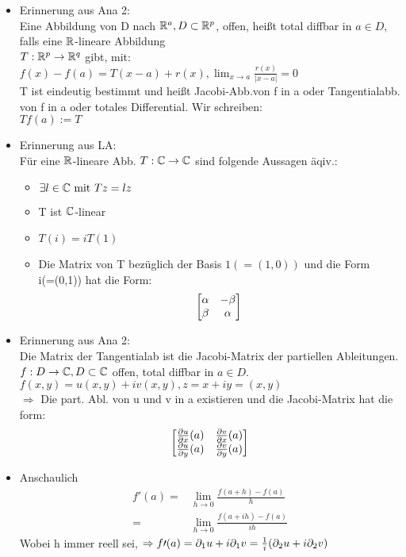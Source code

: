 \documentclass[11pt]{article}
\begin{document}
\begin{bemerkung}
\leavevmode
\begin{itemize}
	\item
	Erinnerung aus Ana 2:\\
	Eine Abbildung von D nach $\mathbb{R}^a, D \subset \mathbb{R}^p$, offen, heißt total
	diffbar in $a \in D$, falls eine $\mathbb{R}$-lineare Abbildung \\
	$T: \mathbb{R}^p \to \mathbb{R}^q$ gibt, mit:\\
	$f(x)-f(a) = T(x-a) +r(x), \lim_{x \to a} \frac{r(x)}{|x-a|}= 0$\\
	T ist eindeutig bestimmt und heißt Jacobi-Abb.von f in a 
	oder Tangentialabb. von f in a oder totales Differential. Wir 
	schreiben: \\
	$Tf(a) := T$ \\
	\item
	Erinnerung aus LA:\\
	Für eine $\mathbb{R}$-lineare Abb. $T: \mathbb{C} \to \mathbb{C}$ sind folgende Aussagen äqiv.:
	\begin{itemize}
		\item
		$\exists l \in \mathbb{C} \text{ mit } Tz = lz$
		\item
		T ist $\mathbb{C}$-linear
		\item
		$T(i) = iT(1)$
		\item
		Die Matrix von T bezüglich der Basis $1(=(1,0))$ und die Form \\
		i(=(0,1)) hat die Form:
		\[
		\begin{bmatrix}
		\alpha & -\beta\\
		\beta & \alpha
		\end{bmatrix}
		\]
	\end{itemize}
	\item
	Erinnerung aus Ana 2:\\
	Die Matrix der Tangentialab ist die Jacobi-Matrix der 
	partiellen Ableitungen.\\
	$f:D \to \mathbb{C}, D\subset \mathbb{C}$ offen, total diffbar in $a \in D$.\\
	$f(x,y) = u(x,y) +iv(x,y), z = x+iy=(x,y)$\\
	$\Rightarrow$ Die part. Abl. von u und v in a existieren und die 
	Jacobi-Matrix hat die form:
	\[
	\begin{bmatrix}
	\frac{\partial u}{\partial x}(a) & \frac{\partial v}{\partial x}(a)\\
	\frac{\partial u}{\partial y}(a) & \frac{\partial v}{\partial y}(a)\\
	\end{bmatrix}	 
	\]
	\item
	Anschaulich
	\begin{eqnarray*}
	f\prime(a) =&\lim_{h \to 0} \frac{f(a+h)-f(a)}{h}\\
	=& \lim_{h\to 0} \frac{f(a+ih)-f(a)}{ih}
	\end{eqnarray*}
	Wobei h immer reell sei,
	$\Rightarrow f\prime(a) = \partial_1 u + i\partial_1 v = \frac{1}{i}(\partial_2 u 
	+ i \partial_2 v)$
\end{itemize}
\end{bemerkung}
\end{document}
